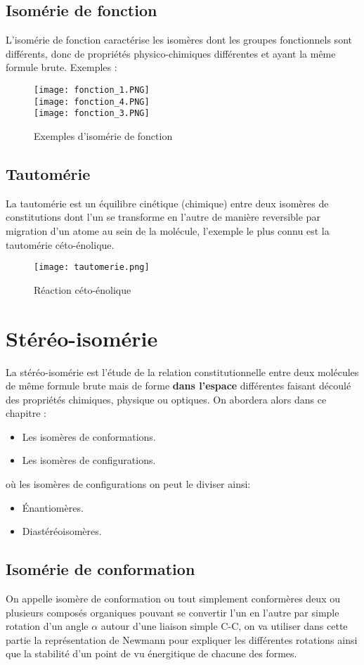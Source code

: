 \documentclass[a4paper, oneside]{book}
\begin{document}
\section{Isomérie de fonction}
L'isomérie de fonction caractérise les isomères dont les groupes fonctionnels sont différents, donc de propriétés physico-chimiques différentes et ayant la même formule brute. Exemples :
\begin{figure}[!h]
    \centering
    \texttt{[image: fonction\_1.PNG]}\\
    \texttt{[image: fonction\_4.PNG]}\\
    \texttt{[image: fonction\_3.PNG]}
    \caption{Exemples d'isomérie de fonction}
    \label{fig:my_label}
\end{figure}
\section{Tautomérie}
La tautomérie est un équilibre cinétique (chimique) entre deux isomères de constitutions dont l'un se transforme en l'autre de manière reversible par migration d'un atome au sein de la molécule, l'exemple le plus connu est la tautomérie céto-énolique.
\begin{figure}[!ht]
    \centering
    \texttt{[image: tautomerie.png]}
    \caption{Réaction céto-énolique}
    \label{fig:my_label}
\end{figure}
\chapter{Stéréo-isomérie}
\minitoc
La stéréo-isomérie est l'étude de la relation constitutionnelle entre deux molécules de même formule brute mais de forme \textbf{dans l'espace} différentes faisant découlé des propriétés chimiques, physique ou optiques. On abordera alors dans ce chapitre :
\begin{itemize}
    \item Les isomères de conformations.
    \item Les isomères de configurations.
\end{itemize}
où les isomères de configurations on peut le diviser ainsi:
\begin{itemize}
    \item \'Enantiomères.
    \item Diastéréoisomères.
\end{itemize}
\section{Isomérie de conformation}
On appelle isomère de conformation ou tout simplement conformères deux ou plusieurs composés organiques pouvant se convertir l'un en l'autre par simple rotation d'un angle $\alpha$ autour d'une liaison simple C-C, on va utiliser dans cette partie la représentation de Newmann pour expliquer les différentes rotations ainsi que la stabilité d'un point de vu énergitique de chacune des formes.
\end{document}
